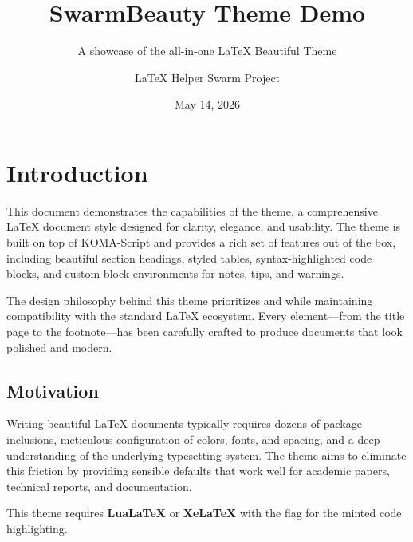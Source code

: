 \documentclass[11pt, a4paper]{scrartcl}
\title{SwarmBeauty Theme Demo}
\subtitle{A showcase of the all-in-one LaTeX Beautiful Theme}
\author{LaTeX Helper Swarm Project}
\date{May 14, 2026}
\begin{document}

\swarmtitlepage


\tableofcontents
\newpage


\section{Introduction}

This document demonstrates the capabilities of the  theme, a comprehensive
LaTeX document style designed for clarity, elegance, and usability. The theme is built on
top of KOMA-Script and provides a rich set of features out of the box, including beautiful
section headings, styled tables, syntax-highlighted code blocks, and custom block
environments for notes, tips, and warnings.

The design philosophy behind this theme prioritizes  and
 while maintaining compatibility with the standard
LaTeX ecosystem. Every element---from the title page to the footnote---has been
carefully crafted to produce documents that look polished and modern.

\subsection{Motivation}

Writing beautiful LaTeX documents typically requires dozens of package inclusions,
meticulous configuration of colors, fonts, and spacing, and a deep understanding of
the underlying typesetting system. The  theme aims to eliminate this
friction by providing sensible defaults that work well for academic papers, technical
reports, and documentation.

\begin{noteblock}
This theme requires \textbf{LuaLaTeX} or \textbf{XeLaTeX} with the
 flag for the minted code highlighting.
\end{noteblock}
\end{document}
